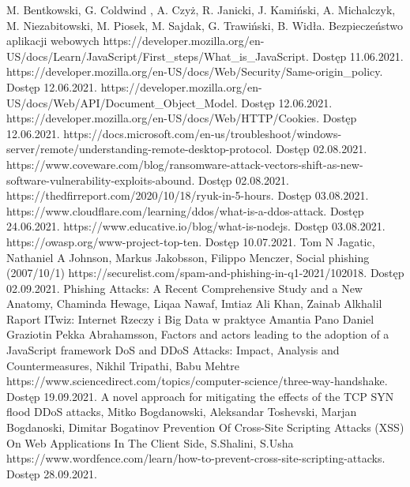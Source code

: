 \documentclass[12pt,twoside]{article}
\begin{document}
\begin{thebibliography}{4}
	
 M. Bentkowski, G. Coldwind , A. Czyż, R. Janicki, J. Kamiński, A. Michalczyk, M. Niezabitowski, M. Piosek, M. Sajdak, G. Trawiński, B. Widła. Bezpieczeństwo aplikacji webowych
 https://developer.mozilla.org/en-US/docs/Learn/JavaScript/First{\_}steps/What{\_}is{\_}JavaScript. Dostęp 11.06.2021.
 https://developer.mozilla.org/en-US/docs/Web/Security/Same-origin{\_}policy. Dostęp 12.06.2021.
 https://developer.mozilla.org/en-US/docs/Web/API/Document{\_}Object{\_}Model. Dostęp 12.06.2021. 
 https://developer.mozilla.org/en-US/docs/Web/HTTP/Cookies. Dostęp 12.06.2021.
 https://docs.microsoft.com/en-us/troubleshoot/windows-server/remote/understanding-remote-desktop-protocol. Dostęp 02.08.2021.
 https://www.coveware.com/blog/ransomware-attack-vectors-shift-as-new-software-vulnerability-exploits-abound. Dostęp 02.08.2021.
 https://thedfirreport.com/2020/10/18/ryuk-in-5-hours. Dostęp 03.08.2021.
 https://www.cloudflare.com/learning/ddos/what-is-a-ddos-attack. Dostęp 24.06.2021.
 https://www.educative.io/blog/what-is-nodejs. Dostęp 03.08.2021.
 https://owasp.org/www-project-top-ten. Dostęp 10.07.2021.
 Tom N Jagatic, Nathaniel A Johnson, Markus Jakobsson, Filippo Menczer, Social phishing (2007/10/1)
 https://securelist.com/spam-and-phishing-in-q1-2021/102018. Dostęp 02.09.2021.
 Phishing Attacks: A Recent Comprehensive Study and a New Anatomy, Chaminda Hewage, Liqaa Nawaf, Imtiaz Ali Khan, Zainab Alkhalil
 Raport ITwiz: Internet Rzeczy i Big Data w praktyce
 Amantia Pano Daniel Graziotin Pekka Abrahamsson, Factors and actors leading to the adoption of a JavaScript framework 
 DoS and DDoS Attacks: Impact, Analysis and Countermeasures, Nikhil Tripathi, Babu Mehtre
 https://www.sciencedirect.com/topics/computer-science/three-way-handshake. Dostęp 19.09.2021.
 A novel approach for mitigating the effects of the TCP SYN flood DDoS attacks, Mitko Bogdanowski, Aleksandar Toshevski, Marjan Bogdanoski, Dimitar Bogatinov
 Prevention Of Cross-Site Scripting Attacks (XSS) On Web Applications In The Client Side, S.Shalini, S.Usha
 https://www.wordfence.com/learn/how-to-prevent-cross-site-scripting-attacks. Dostęp 28.09.2021.

\end{thebibliography}
\end{document}
